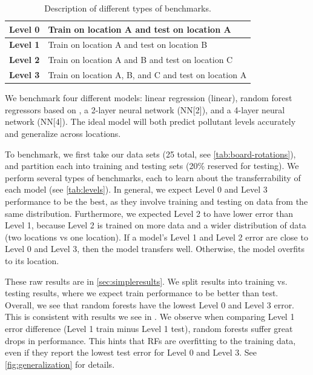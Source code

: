 \documentclass[journal abbreviation, manuscript]{copernicus}
\begin{document}
\begin{table}[H]
\centering
\begin{tabular}{|l|l|}
\hline
\textbf{Level 0} & Train on location A and test on location A \\ \hline
\textbf{Level 1} & Train on location A and test on location B \\ \hline
\textbf{Level 2} & Train on location A and B and test on location C \\ \hline
\textbf{Level 3} & Train on location A, B, and C and test on location A \\ \hline
\end{tabular}
\caption{Description of different types of benchmarks.}
\label{tab:levels}
\end{table}

We benchmark four different models: linear regression (linear), random forest regressors based on \citep{Zimmerman2018},
a 2-layer neural network (NN[2]), and a 4-layer neural network (NN[4]). The ideal model will
both predict pollutant levels accurately and
generalize across locations.

To benchmark, we first take our data sets (25 total, see \autoref{tab:board-rotations}), and partition each into training and testing sets (20\% reserved for testing).
We perform several types of benchmarks,
each to learn about the transferrability of each model (see \autoref{tab:levels}).
In general, we expect Level 0 and Level 3 performance to be the best, as they involve training and testing on data from the same distribution. Furthermore, we expected Level 2 to have lower error than Level 1, because Level 2 is trained on more data and a wider distribution of data (two locations vs one location).
If a model's Level 1 and Level 2 error are close to Level 0 and Level 3, then the model transfers well. Otherwise, the model overfits to its location.


These raw results are in \autoref{sec:simpleresults}. We split results into training vs. testing results, where we expect train performance to be better than test. Overall, we see that random forests have the lowest Level 0 and Level 3 error. This is consistent with results we see in \citet{Zimmerman2018}. We observe when comparing Level 1 error difference (Level 1 train minus Level 1 test), random forests suffer great drops in performance. This hints that RFs are overfitting to the training data, even if they report the lowest test error for Level 0 and Level 3. See \autoref{fig:generalization} for details.
\end{document}
